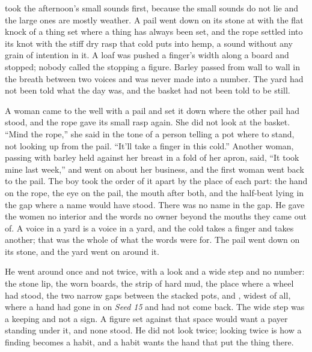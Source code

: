  took the afternoon's small sounds first, because the small sounds do not lie and the large ones are mostly weather. A pail went down on its stone at  with the flat knock of a thing set where a thing has always been set, and the rope settled into its knot with the stiff dry rasp that cold puts into hemp, a sound without any grain of intention in it. A loaf was pushed a finger's width along a board and stopped; nobody called the stopping a figure. Barley passed from wall to wall in the breath between two voices and was never made into a number. The yard had not been told what the day was, and the basket had not been told to be still.

A woman came to the well with a pail and set it down where the other pail had stood, and the rope gave its small rasp again. She did not look at the basket. “Mind the rope,” she said in the tone of a person telling a pot where to stand, not looking up from the pail. “It'll take a finger in this cold.” Another woman, passing with barley held against her breast in a fold of her apron, said, “It took mine last week,” and went on about her business, and the first woman went back to the pail. The boy took the order of it apart by the place of each part: the hand on the rope, the eye on the pail, the mouth after both, and the half-beat lying in the gap where a name would have stood. There was no name in the gap. He gave the women no interior and the words no owner beyond the mouths they came out of. A voice in a yard is a voice in a yard, and the cold takes a finger and takes another; that was the whole of what the words were for. The pail went down on its stone, and the yard went on around it.

He went around  once and not twice, with a look and a wide step and no number: the stone lip, the worn boards, the strip of hard mud, the place where a wheel had stood, the two narrow gaps between the stacked pots, and , widest of all, where a hand had gone in on \emph{Seed 15} and had not come back. The wide step was a keeping and not a sign. A figure set against that space would want a payer standing under it, and none stood. He did not look twice; looking twice is how a finding becomes a habit, and a habit wants the hand that put the thing there.

